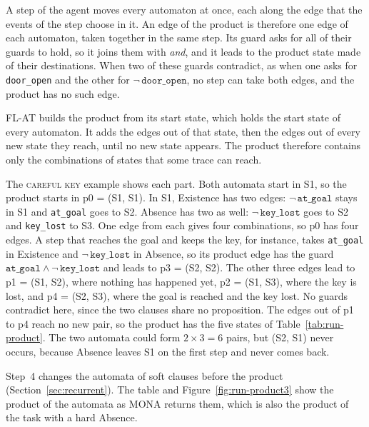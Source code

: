 \documentclass[11pt,english,listoffigures,listoftables]{tfgetsinf}
\newcommand{\runex}[1]{\textsc{#1}}  %
\begin{document}
A step of the agent moves every automaton at once, each along the edge that the events of the step choose in it. An edge of the product is therefore one edge of each automaton, taken together in the same step. Its guard asks for all of their guards to hold, so it joins them with \textit{and}, and it leads to the product state made of their destinations. When two of these guards contradict, as when one asks for \texttt{door\_open} and the other for $\neg\,\texttt{door\_open}$, no step can take both edges, and the product has no such edge.

FL-AT builds the product from its start state, which holds the start state of every automaton. It adds the edges out of that state, then the edges out of every new state they reach, until no new state appears. The product therefore contains only the combinations of states that some trace can reach.

The \runex{careful key} example shows each part. Both automata start in S1, so the product starts in p0 = (S1, S1). In S1, Existence has two edges: $\neg\,\texttt{at\_goal}$ stays in S1 and \texttt{at\_goal} goes to S2. Absence has two as well: $\neg\,\texttt{key\_lost}$ goes to S2 and \texttt{key\_lost} to S3. One edge from each gives four combinations, so p0 has four edges. A step that reaches the goal and keeps the key, for instance, takes \texttt{at\_goal} in Existence and $\neg\,\texttt{key\_lost}$ in Absence, so its product edge has the guard $\texttt{at\_goal} \land \neg\,\texttt{key\_lost}$ and leads to p3 = (S2, S2). The other three edges lead to p1 = (S1, S2), where nothing has happened yet, p2 = (S1, S3), where the key is lost, and p4 = (S2, S3), where the goal is reached and the key lost. No guards contradict here, since the two clauses share no proposition. The edges out of p1 to p4 reach no new pair, so the product has the five states of Table~\ref{tab:run-product}. The two automata could form $2 \times 3 = 6$ pairs, but (S2, S1) never occurs, because Absence leaves S1 on the first step and never comes back.

Step~4 changes the automata of soft clauses before the product (Section~\ref{sec:recurrent}). The table and Figure~\ref{fig:run-product3} show the product of the automata as MONA returns them, which is also the product of the task with a hard Absence.
\end{document}
